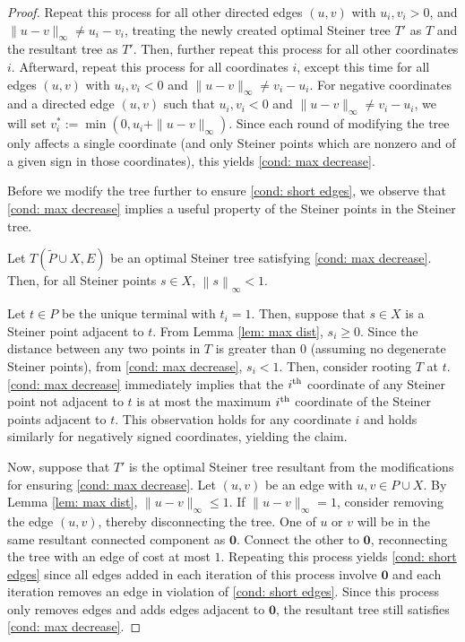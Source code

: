 \documentclass{theoretics}
\newcommand{\1}{\textbf{1}}
\newcommand{\norm}[1]{\left\lVert#1\right\rVert}
\renewcommand{\tilde}{\widetilde}
\begin{document}
\begin{proof}
Repeat this process for all other directed edges $(u,v)$ with  $u_i, v_i > 0$, and $\|u - v\|_{\infty} \neq u_i - v_i$, treating the newly created optimal Steiner tree $T'$ as $T$ and the resultant tree as $T'$. Then, further repeat this process for all other coordinates $i$. Afterward, repeat this process for all coordinates $i$, except this time for all edges $(u,v)$ with $u_i, v_i < 0$ and  $\|u - v\|_{\infty} \neq  v_i - u_i$. For negative coordinates and a directed edge $(u,v)$ such that $u_i, v_i < 0$ and $\|u -v\|_{\infty} \neq v_i - u_i$, we will set $v_i^* := \min(0, u_i + \|u-v\|_{\infty})$. Since each round of modifying the tree only affects a single coordinate (and only Steiner points which are nonzero and of a given sign in those coordinates), this yields \ref{cond: max decrease}. 

Before we modify the tree further to ensure \ref{cond: short edges}, we observe that \ref{cond: max decrease} implies a useful property of the Steiner points in the Steiner tree.
\begin{claim} \label{cla: Steiner point magnitude less than 1}
Let $T(\tilde{P} \cup X, E)$ be an optimal Steiner tree satisfying \ref{cond: max decrease}. Then, for all Steiner points $s \in X$, $\norm{s}_{\infty} < 1.$
\end{claim}
\begin{subproof}
Let $t \in P$ be the unique terminal with $t_i = 1$. Then, suppose that $s \in X$ is a Steiner point adjacent to $t$. From Lemma \ref{lem: max dist}, $s_i \geq 0$. Since the distance between any two points in $T$ is greater than $0$ (assuming no degenerate Steiner points), from \ref{cond: max decrease}, $s_i < 1$. Then, consider rooting $T$ at $t$. \ref{cond: max decrease} immediately implies that the $i\textsuperscript{th} $ coordinate of any Steiner point not adjacent to $t$ is at most the maximum $i\textsuperscript{th} $ coordinate of the Steiner points adjacent to $t$. This observation holds for any coordinate $i$ and holds similarly for negatively signed coordinates, yielding the claim.
\end{subproof}

Now, suppose that $T'$ is the optimal Steiner tree resultant from the modifications for ensuring \ref{cond: max decrease}. Let $(u,v)$ be an edge with $u,v \in P \cup X$. By Lemma \ref{lem: max dist}, $\|u - v\|_{\infty} \leq 1$. If $\|u - v\|_{\infty} = 1$, consider removing the edge $(u,v)$, thereby disconnecting the tree. One of $u$ or $v$ will be in the same resultant connected component as $\mathbf{0}$. Connect the other to $\mathbf{0}$, reconnecting the tree with an edge of cost at most $1$. Repeating this process yields \ref{cond: short edges} since all edges added in each iteration of this process involve $\mathbf{0}$ and each iteration removes an edge in violation of \ref{cond: short edges}. Since this process only removes edges and adds edges adjacent to $\mathbf{0}$,  the resultant tree still satisfies \ref{cond: max decrease}.
\end{proof}
\end{document}
